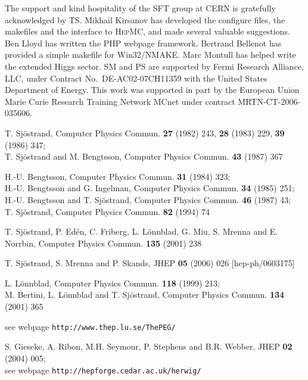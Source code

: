 \documentclass{elsartmod}
\begin{document}
\ack
 
The support and kind hospitality of the SFT group at CERN is 
gratefully acknowledged by TS. Mikhail Kirsanov has developed 
the configure files, the makefiles and the interface to 
\textsc{HepMC}, and made several valuable suggestions. Ben Lloyd 
has written the PHP webpage framework. Bertrand Bellenot has provided 
a simple makefile for Win32/NMAKE. Marc Montull has helped write
the extended Higgs sector. SM and PS are supported by Fermi Research 
Alliance, LLC, under Contract No.~DE-AC02-07CH11359 with the United 
States Department of Energy. This work was supported in part by 
the European Union Marie Curie Research Training Network MCnet 
under contract MRTN-CT-2006-035606.

\begin{thebibliography}{99}

T. Sj\"ostrand, Computer Physics Commun. {\bf 27} (1982) 243, 
{\bf 28} (1983) 229, {\bf 39} (1986) 347;\\
T. Sj\"ostrand and M. Bengtsson, Computer Physics Commun.
{\bf 43} (1987) 367

H.-U. Bengtsson, Computer Physics Commun. {\bf 31} (1984) 323;\\
H.-U. Bengtsson and G. Ingelman, Computer Physics Commun. {\bf 34}
(1985) 251;\\
H.-U. Bengtsson and T. Sj\"ostrand, Computer Physics Commun.
{\bf 46} (1987) 43;\\
T. Sj\"ostrand, Computer Physics Commun. {\bf 82} (1994) 74

T. Sj\"ostrand, P. Ed\'en, C. Friberg, L. L\"onnblad, G. Miu, 
S. Mrenna and E. Norrbin, Computer Physics Commun. {\bf 135} (2001) 238

T. Sj\"ostrand, S. Mrenna and P. Skands, JHEP {\bf 05} (2006) 026 
[hep-ph/0603175]

L. L\"onnblad, Computer Physics Commun. {\bf 118} (1999) 213;\\
M. Bertini, L. L\"onnblad and T. Sj\"ostrand,
Computer Physics Commun. {\bf 134} (2001) 365

see webpage \texttt{http://www.thep.lu.se/ThePEG/}

S. Gieseke, A. Ribon, M.H. Seymour, P. Stephens and B.R. Webber,
JHEP {\bf 02} (2004) 005;\\
see webpage \texttt{http://hepforge.cedar.ac.uk/herwig/}


\end{thebibliography}
\end{document}
